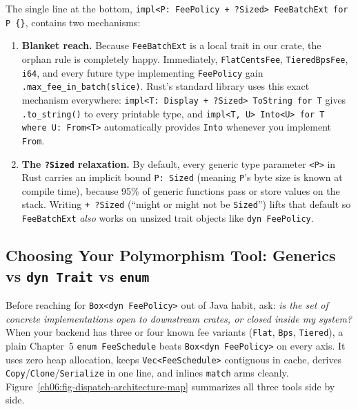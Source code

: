 The single line at the bottom, \texttt{impl<P: FeePolicy + ?Sized> FeeBatchExt for P \{\}}, contains two mechanisms:

\begin{enumerate}
  \item \textbf{Blanket reach.} Because \texttt{FeeBatchExt} is a local trait in our crate, the orphan rule is completely happy. Immediately, \texttt{FlatCentsFee}, \texttt{TieredBpsFee}, \texttt{i64}, and every future type implementing \texttt{FeePolicy} gain \texttt{.max\_fee\_in\_batch(slice)}. Rust's standard library uses this exact mechanism everywhere: \texttt{impl<T: Display + ?Sized> ToString for T} gives \texttt{.to\_string()} to every printable type, and \texttt{impl<T, U> Into<U> for T where U: From<T>} automatically provides \texttt{Into} whenever you implement \texttt{From}.
  \item \textbf{The \texttt{?Sized} relaxation.} By default, every generic type parameter \texttt{<P>} in Rust carries an implicit bound \texttt{P: Sized} (meaning \texttt{P}'s byte size is known at compile time), because 95\% of generic functions pass or store values on the stack. Writing \texttt{+ ?Sized} (``might or might not be \texttt{Sized}'') lifts that default so \texttt{FeeBatchExt} \emph{also} works on unsized trait objects like \texttt{dyn FeePolicy}.
\end{enumerate}

\subsection{Choosing Your Polymorphism Tool: Generics vs \texttt{dyn Trait} vs \texttt{enum}}

Before reaching for \texttt{Box<dyn FeePolicy>} out of Java habit, ask: \emph{is the set of concrete implementations open to downstream crates, or closed inside my system?} When your backend has three or four known fee variants (\texttt{Flat}, \texttt{Bps}, \texttt{Tiered}), a plain Chapter~5 \texttt{enum FeeSchedule} beats \texttt{Box<dyn FeePolicy>} on every axis. It uses zero heap allocation, keeps \texttt{Vec<FeeSchedule>} contiguous in cache, derives \texttt{Copy}/\texttt{Clone}/\texttt{Serialize} in one line, and inlines \texttt{match} arms cleanly. Figure~\ref{ch06:fig-dispatch-architecture-map} summarizes all three tools side by side.

